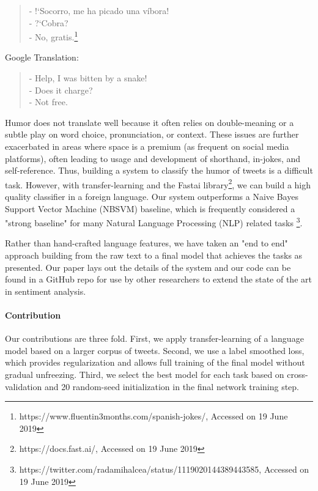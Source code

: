 \documentclass[runningheads]{llncs}
\begin{document}
\begin{quote}
- !`Socorro, me ha picado una víbora!\\
- ?`Cobra?\\
- No, gratis.\footnote{https://www.fluentin3months.com/spanish-jokes/, Accessed on 19 June 2019}
\end{quote}
Google Translation:
\begin{quote}
- Help, I was bitten by a snake!\\
- Does it charge?\\
- Not free.
\end{quote}
Humor does not translate well because it often relies on double-meaning or a subtle play on word choice, pronunciation, or context.  These issues are further exacerbated in areas where space is a premium (as frequent on social media platforms), often leading to usage and development of shorthand, in-jokes, and self-reference. Thus, building a system to classify the humor of tweets is a difficult task.  However, with transfer-learning and the Fastai library\footnote{https://docs.fast.ai/, Accessed on 19 June 2019}, we can build a high quality classifier in a foreign language. Our system outperforms a Naive Bayes Support Vector Machine (NBSVM) baseline, which is frequently considered a "strong baseline" for many Natural Language Processing (NLP) related tasks \footnote{https://twitter.com/radamihalcea/status/1119020144389443585, Accessed on 19 June 2019}.

Rather than hand-crafted language features, we have taken an "end to end" approach building from the raw text to a final model that achieves the tasks as presented.  Our paper lays out the details of the system and our code can be found in a GitHub repo for use by other researchers to extend the state of the art in sentiment analysis. 

\paragraph{Contribution} Our contributions are three fold.  First, we apply transfer-learning of a language model based on a larger corpus of tweets.  Second, we use a label smoothed loss, which provides regularization and allows full training of the final model without gradual unfreezing.  Third, we select the best model for each task based on cross-validation and 20 random-seed initialization in the final network training step.
\end{document}
